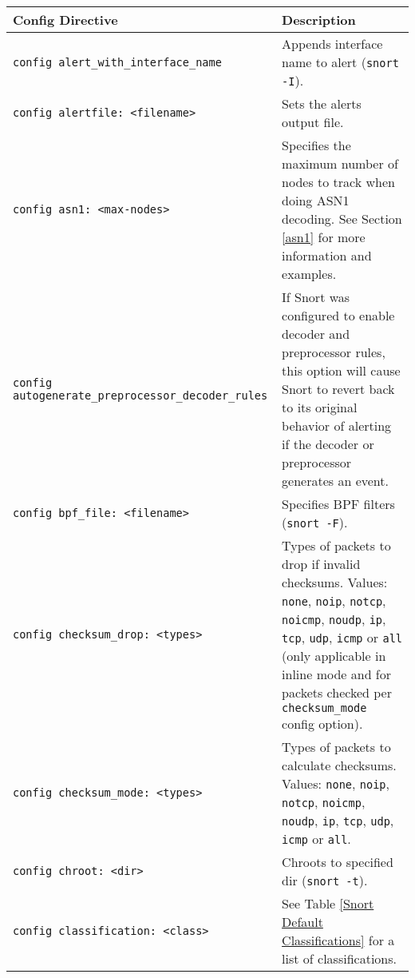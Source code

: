 \documentclass[english]{report}
\begin{document}
\newpage
\begin{center}
\begin{longtable}[t]{| p{2.5in} | p{3.5in} |}

\hline
{\bf Config Directive} & {\bf Description}\\
\hline

\hline
\texttt{config alert\_with\_interface\_name} & Appends interface name to alert
(\texttt{snort -I}). \\

\hline
\texttt{config alertfile: <filename>} & Sets the alerts output file. \\

\hline
\texttt{config asn1: <max-nodes>} & Specifies the maximum number of nodes to track when
doing ASN1 decoding. See Section \ref{asn1} for more information and
examples.\\

\hline
\texttt{config autogenerate\_preprocessor\newline \_decoder\_rules} & If Snort was
configured to enable decoder and preprocessor rules, this option will cause
Snort to revert back to its original behavior of alerting if the decoder or
preprocessor generates an event. \\

\hline
\texttt{config bpf\_file: <filename>} & Specifies BPF filters (\texttt{snort
-F}). \\

\hline
\texttt{config checksum\_drop: <types>} & Types of packets to drop if invalid
checksums. Values: \texttt{none}, \texttt{noip}, \texttt{notcp},
\texttt{noicmp}, \texttt{noudp}, \texttt{ip}, \texttt{tcp}, \texttt{udp},
\texttt{icmp} or \texttt{all} (only applicable in inline mode and for packets
checked per \texttt{checksum\_mode} config option). \\

\hline
\texttt{config checksum\_mode: <types>} & Types of packets to calculate checksums.
Values: \texttt{none}, \texttt{noip}, \texttt{notcp}, \texttt{noicmp},
\texttt{noudp}, \texttt{ip}, \texttt{tcp}, \texttt{udp}, \texttt{icmp} or
\texttt{all}. \\

\hline
\texttt{config chroot: <dir>} & Chroots to specified dir (\texttt{snort
-t}). \\

\hline
\texttt{config classification: <class>} & See Table
\ref{Snort Default Classifications} for a list of classifications.\\


\end{longtable}
\end{center}
\end{document}
